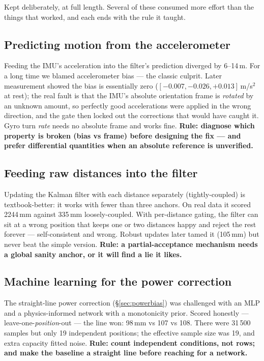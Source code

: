 \documentclass[11pt,a4paper]{article}
\begin{document}
Kept deliberately, at full length. Several of these consumed more effort than the
things that worked, and each ends with the rule it taught.

\subsection{Predicting motion from the accelerometer}
\label{sec:fail-imuaccel}
Feeding the IMU's acceleration into the filter's prediction diverged by 6--14\,m.
For a long time we blamed accelerometer bias --- the classic culprit. Later
measurement showed the bias is essentially zero
($[-0.007, -0.026, +0.013]$\,m/s$^2$ at rest); the real fault is that the IMU's
absolute orientation frame is \emph{rotated} by an unknown amount, so perfectly
good accelerations were applied in the wrong direction, and the gate then locked
out the corrections that would have caught it. Gyro turn \emph{rate} needs no
absolute frame and works fine. \textbf{Rule: diagnose which property is broken
(bias vs frame) before designing the fix --- and prefer differential quantities
when an absolute reference is unverified.}

\subsection{Feeding raw distances into the filter}
Updating the Kalman filter with each distance separately (tightly-coupled) is
textbook-better: it works with fewer than three anchors. On real data it scored
2244\,mm against 335\,mm loosely-coupled. With per-distance gating, the filter can
sit at a wrong position that keeps one or two distances happy and reject the rest
forever --- self-consistent and wrong. Robust updates later tamed it (105\,mm) but
never beat the simple version. \textbf{Rule: a partial-acceptance mechanism needs a
global sanity anchor, or it will find a lie it likes.}

\subsection{Machine learning for the power correction}
\label{sec:fail-ml}
The straight-line power correction (\S\ref{sec:powerbias}) was challenged with an
MLP and a physics-informed network with a monotonicity prior. Scored honestly ---
leave-one-\emph{position}-out --- the line won: 98\,mm vs 107 vs 108. There were
31\,500 samples but only 19 independent positions; the effective sample size was
19, and extra capacity fitted noise. \textbf{Rule: count independent conditions,
not rows; and make the baseline a straight line before reaching for a network.}
\end{document}
